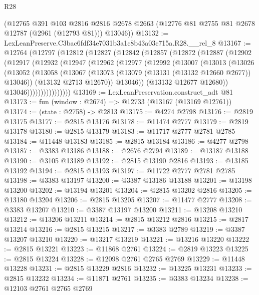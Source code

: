 \begin{lexlean}{R28}
\begin{coremodule}
      (@12765
        @391
        @103
        @2816
        @2816
        @2678
        @2663
        (@12776 @81 @2755 @81 @2678 @12787 (@2961 (@12793 @81)))
        @13046))
@13132 := LexLeanPreserve.C3bac6fdf34e7031b3a1c8b43a03c715a.R28.__rel_8
@13167 := @12764
    (@12797
      (@12812
        (@12827
          (@12842
            (@12857
              (@12872
                (@12887
                  (@12902
                    (@12917
                      (@12932
                        (@12947
                          (@12962
                            (@12977
                              (@12992
                                (@13007
                                  (@13013
                                    (@13026
                                      (@13052
                                        (@13058
                                          (@13067
                                            (@13073 (@13079 (@13131 (@13132 @12660 @2677)) @13046))
                                            (@13132 @2713 @12670))
                                          @13046))
                                      (@13132 @12677 @12680))
                                    @13046))))))))))))))))
@13169 := LexLeanPreservation.construct_adt @81
@13173 := fun (window : @2674) => @12733 (@13167 (@13169 @12761))
@13174 := (state : @2758) -> @2813
@13175 := @4274 @2798
@13176 := @2819 @13175
@13177 := @2815 @13176
@13178 := @11474 @2777
@13179 := @2819 @13178
@13180 := @2815 @13179
@13183 := @11717 @2777 @2781 @2785
@13184 := @11448 @13183
@13185 := @2815 @13184
@13186 := @4277 @2798
@13187 := @3383 @13186
@13188 := @2676 @2794
@13189 := @13187 @13188
@13190 := @3105 @13189
@13192 := @2815 @13190 @2816
@13193 := @13185 @13192
@13194 := @2815 @13193
@13197 := @11722 @2777 @2781 @2785
@13198 := @3383 @13197
@13200 := @3387 @13186 @13188
@13201 := @13198 @13200
@13202 := @13194 @13201
@13204 := @2815 @13202 @2816
@13205 := @13180 @13204
@13206 := @2815 @13205
@13207 := @11477 @2777
@13208 := @3383 @13207
@13210 := @3387 @13197 @13200
@13211 := @13208 @13210
@13212 := @13206 @13211
@13214 := @2815 @13212 @2816
@13215 := @2817 @13214
@13216 := @2815 @13215
@13217 := @3383 @2789
@13219 := @3387 @13207 @13210
@13220 := @13217 @13219
@13221 := @13216 @13220
@13222 := @2815 @13221
@13223 := @11868 @2761
@13224 := @2819 @13223
@13225 := @2815 @13224
@13228 := @12098 @2761 @2765 @2769
@13229 := @11448 @13228
@13231 := @2815 @13229 @2816
@13232 := @13225 @13231
@13233 := @2815 @13232
@13234 := @11871 @2761
@13235 := @3383 @13234
@13238 := @12103 @2761 @2765 @2769

\end{coremodule}
\end{lexlean}
